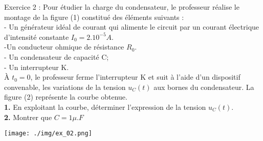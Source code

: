\documentclass[12pt, french]{article}
\begin{document}


\begin{Box2}{Exercice 2 : }
	Pour étudier la charge du
	condensateur, le professeur réalise le
	montage de la figure (1) constitué des
	éléments suivants :
	\\- Un générateur idéal de courant
	qui alimente le circuit par un
	courant électrique d'intensité
	constante $I_0 = 2.10^{-5}A$.
	\\-Un conducteur ohmique de résistance $R_0$.
	\\- Un condensateur de capacité C;
	\\- Un interrupteur K.
	\\À $t_0 =0$, le professeur ferme l'interrupteur K et suit à l'aide d'un dispositif convenable, les variations
	de la tension $u_C(t)$ aux bornes du condensateur. La figure (2) représente la courbe obtenue.
	\\\textbf{1. }En exploitant la courbe, déterminer l'expression de la tension $u_C(t)$.
	\\\textbf{2. }Montrer que $C=1\mu.F$

	\begin{center}
		\texttt{[image: ./img/ex\_02.png]}
	\end{center}




\end{Box2}
\end{document}
